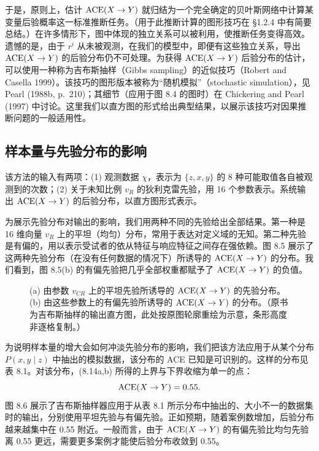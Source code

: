 于是，原则上，估计 $\mathrm{ACE}(X\to Y)$ 就归结为一个完全确定的贝叶斯网络中计算某变量后验概率这一标准推断任务。（用于此推断计算的图形技巧在 \S 1.2.4 中有简要总结。）在许多情形下，图中体现的独立关系可以被利用，使推断任务变得高效。遗憾的是，由于 $r^i$ 从未被观测，在我们的模型中，即便有这些独立关系，导出 $\mathrm{ACE}(X\to Y)$ 的后验分布仍不可处理。为获得 $\mathrm{ACE}(X\to Y)$ 后验分布的估计，可以使用一种称为吉布斯抽样（Gibbs sampling）的近似技巧（Robert and Casella 1999）。该技巧的图形版本被称为“随机模拟”（stochastic simulation），见 Pearl (1988b, p.~210)；其细节（应用于图 8.4 的图时）在 Chickering and Pearl (1997) 中讨论。这里我们以直方图的形式给出典型结果，以展示该技巧对因果推断问题的一般适用性。

\subsection{样本量与先验分布的影响}

该方法的输入有两项：(1) 观测数据 $\chi$，表示为 $\{z,x,y\}$ 的 8 种可能取值各自被观测到的次数；(2) 关于未知比例 $v_R$ 的狄利克雷先验，用 16 个参数表示。系统输出 $\mathrm{ACE}(X\to Y)$ 的后验分布，以直方图形式表示。

为展示先验分布对输出的影响，我们用两种不同的先验给出全部结果。第一种是 16 维向量 $v_R$ 上的平坦（均匀）分布，常用于表达对定义域的无知。第二种先验是有偏的，用以表示受试者的依从特征与响应特征之间存在强依赖。图 8.5 展示了这两种先验分布（在没有任何数据的情况下）所诱导的 $\mathrm{ACE}(X\to Y)$ 的分布。我们看到，图 8.5(b) 的有偏先验把几乎全部权重都赋予了 $\mathrm{ACE}(X\to Y)$ 的负值。

\begin{figure}[htbp]
\centering
{}
\caption{(a) 由参数 $v_{CR}$ 上的平坦先验所诱导的 $\mathrm{ACE}(X\to Y)$ 的先验分布。(b) 由这些参数上的有偏先验所诱导的 $\mathrm{ACE}(X\to Y)$ 的分布。（原书为吉布斯抽样的输出直方图，此处按原图轮廓重绘为示意，条形高度非逐格复制。）}
\label{fig:8.5}
\end{figure}

为说明样本量的增大会如何冲淡先验分布的影响，我们把该方法应用于从某个分布 $P(x,y\mid z)$ 中抽出的模拟数据，该分布的 ACE 已知是可识别的。这样的分布见表 8.1。对该分布，\textup{(8.14a,b)} 所得的上界与下界收缩为单一的点：
\[
\mathrm{ACE}(X\to Y)=0.55.
\]
图 8.6 展示了吉布斯抽样器应用于从表 8.1 所示分布中抽出的、大小不一的数据集时的输出，分别使用平坦先验与有偏先验。正如预期，随着案例数增加，后验分布越来越集中在 0.55 附近。一般而言，由于 $\mathrm{ACE}(X\to Y)$ 的有偏先验比均匀先验离 0.55 更远，需要更多案例才能使后验分布收敛到 0.55。

